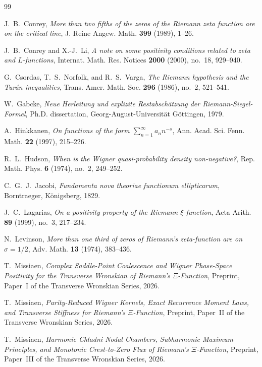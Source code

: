 \documentclass[11pt,reqno]{amsart}
\theoremstyle{definition}
\theoremstyle{remark}
\numberwithin{equation}{section}
\begin{document}
\begin{thebibliography}{99}

J.~B.~Conrey,
\emph{More than two fifths of the zeros of the Riemann zeta function are on the critical line},
J. Reine Angew. Math. \textbf{399} (1989), 1--26.

J.~B.~Conrey and X.-J.~Li,
\emph{A note on some positivity conditions related to zeta and $L$-functions},
Internat. Math. Res. Notices \textbf{2000} (2000), no.~18, 929--940.

G.~Csordas, T.~S.~Norfolk, and R.~S.~Varga,
\emph{The Riemann hypothesis and the Tur\'an inequalities},
Trans. Amer. Math. Soc. \textbf{296} (1986), no.~2, 521--541.

W.~Gabcke,
\emph{Neue Herleitung und explizite Restabsch\"atzung der Riemann-Siegel-Formel},
Ph.D. dissertation, Georg-August-Universit\"at G\"ottingen, 1979.

A.~Hinkkanen,
\emph{On functions of the form $\sum_{n=1}^{\infty} a_n n^{-s}$},
Ann. Acad. Sci. Fenn. Math. \textbf{22} (1997), 215--226.

R.~L.~Hudson,
\emph{When is the Wigner quasi-probability density non-negative?},
Rep. Math. Phys. \textbf{6} (1974), no.~2, 249--252.

C.~G.~J.~Jacobi,
\emph{Fundamenta nova theoriae functionum ellipticarum},
Borntraeger, K\"onigsberg, 1829.

J.~C.~Lagarias,
\emph{On a positivity property of the Riemann $\xi$-function},
Acta Arith. \textbf{89} (1999), no.~3, 217--234.

N.~Levinson,
\emph{More than one third of zeros of Riemann's zeta-function are on $\sigma = 1/2$},
Adv. Math. \textbf{13} (1974), 383--436.

T.~Missiaen,
\emph{Complex Saddle-Point Coalescence and Wigner Phase-Space Positivity for the Transverse Wronskian of Riemann's $\Xi$-Function},
Preprint, Paper~I of the Transverse Wronskian Series, 2026.

T.~Missiaen,
\emph{Parity-Reduced Wigner Kernels, Exact Recurrence Moment Laws, and Transverse Stiffness for Riemann's $\Xi$-Function},
Preprint, Paper~II of the Transverse Wronskian Series, 2026.

T.~Missiaen,
\emph{Harmonic Chladni Nodal Chambers, Subharmonic Maximum Principles, and Monotonic Crest-to-Zero Flux of Riemann's $\Xi$-Function},
Preprint, Paper~III of the Transverse Wronskian Series, 2026.


\end{thebibliography}
\end{document}

